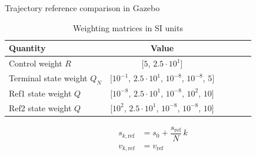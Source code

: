 \documentclass[10pt,aspectratio=1610]{beamer} %
\begin{document}
\begin{frame}{Trajectory reference comparison in Gazebo}
	\begin{table}[h!tbp]
		\small
		\begin{center}
			\begin{tabular}{lccccl}\toprule
				\textbf{Quantity} & \textbf{Value}\\
				\midrule
	
				Control weight $R$ & $[5$, $2.5\cdot10^{1}]$\\
				Terminal state weight $Q_{N}$ & $[10^{-1}$, $2.5\cdot10^{1}$, $10^{-8}$, $10^{-8}$, $5]$\\
				Ref1 state weight $Q$ & $[10^{-8}$, $2.5\cdot10^1$, $10^{-8}$, $10^{2}$, $10]$\\
				Ref2 state weight $Q$ & $[10^{2}$, $2.5\cdot10^1$, $10^{-8}$, $10^{-8}$, $10]$\\
				\bottomrule
			\end{tabular}
		\end{center}
		\caption{Weighting matrices in SI units}
	\end{table}
	
	\begin{align*}
		s_{k, \mathrm{ref}} &= s_{0} + \dfrac{s_{\mathrm{ref}}}{N}\,k \\
		v_{k, \mathrm{ref}} &= v_{\mathrm{ref}}
	\end{align*}
\end{frame}
\end{document}
